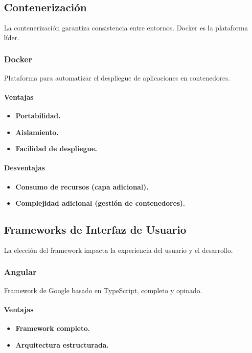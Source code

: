 \subsection{Contenerización}
La contenerización garantiza consistencia entre entornos. Docker es la plataforma líder.
\subsubsection{Docker}
Plataforma para automatizar el despliegue de aplicaciones en contenedores.
\paragraph{Ventajas}
\begin{itemize}
    \item \textbf{Portabilidad.}
    \item \textbf{Aislamiento.}
    \item \textbf{Facilidad de despliegue.}
\end{itemize}
\paragraph{Desventajas}
\begin{itemize}
    \item \textbf{Consumo de recursos (capa adicional).}
    \item \textbf{Complejidad adicional (gestión de contenedores).}
\end{itemize}

\subsection{Frameworks de Interfaz de Usuario}
La elección del framework impacta la experiencia del usuario y el desarrollo.

\subsubsection{Angular}
Framework de Google basado en TypeScript, completo y opinado.
\paragraph{Ventajas}
\begin{itemize}
    \item \textbf{Framework completo.}
    \item \textbf{Arquitectura estructurada.}
\end{itemize}
